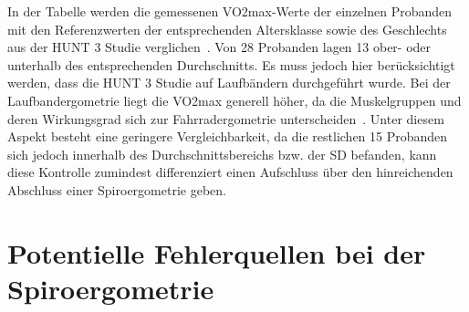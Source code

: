 %
In der Tabelle werden die gemessenen \gls{VO2max}-Werte der einzelnen Probanden mit den Referenzwerten der entsprechenden Altersklasse sowie des Geschlechts aus der HUNT 3 Studie verglichen~\cite{Loe.2014}. Von 28 Probanden lagen 13 ober- oder unterhalb des entsprechenden Durchschnitts. Es muss jedoch hier berücksichtigt werden, dass die HUNT 3 Studie auf Laufbändern durchgeführt wurde. Bei der Laufbandergometrie liegt die \gls{VO2max} generell höher, da die Muskelgruppen und deren Wirkungsgrad sich zur Fahrradergometrie unterscheiden~\cite{Kroidl.2015}. Unter diesem Aspekt besteht eine geringere Vergleichbarkeit, da die restlichen 15 Probanden sich jedoch innerhalb des Durchschnittsbereichs bzw. der \gls{SD} befanden, kann diese Kontrolle zumindest differenziert einen Aufschluss über den hinreichenden Abschluss einer Spiroergometrie geben. 
%
\section{Potentielle Fehlerquellen bei der Spiroergometrie}
%
